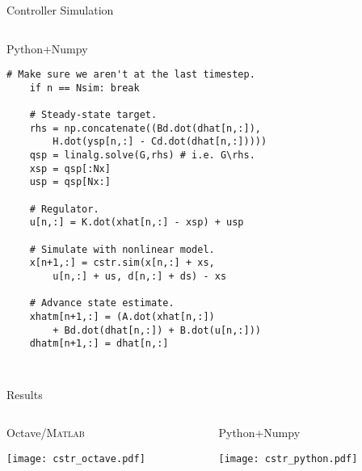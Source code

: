 \documentclass[xcolor=dvipsnames]{beamer}
\begin{document}
\begin{frame}[fragile]{Controller Simulation}
\begin{columns}[T]
\begin{column}[T]{0.45\textwidth}
\begin{block}{Python+Numpy \vphantom{/}}
\begin{lstlisting}[style=python,basicstyle=\ttfamily\fontsize{5pt}{6}\selectfont]
    # Make sure we aren't at the last timestep.
    if n == Nsim: break

    # Steady-state target.
    rhs = np.concatenate((Bd.dot(dhat[n,:]),
        H.dot(ysp[n,:] - Cd.dot(dhat[n,:]))))
    qsp = linalg.solve(G,rhs) # i.e. G\rhs.
    xsp = qsp[:Nx]
    usp = qsp[Nx:]
    
    # Regulator.
    u[n,:] = K.dot(xhat[n,:] - xsp) + usp
    
    # Simulate with nonlinear model.
    x[n+1,:] = cstr.sim(x[n,:] + xs,
        u[n,:] + us, d[n,:] + ds) - xs
    
    # Advance state estimate.
    xhatm[n+1,:] = (A.dot(xhat[n,:])
        + Bd.dot(dhat[n,:]) + B.dot(u[n,:]))
    dhatm[n+1,:] = dhat[n,:]
                       
\end{lstlisting}
\vspace{-.5em}
\end{block}
\end{column}

\end{columns}     

\end{frame}

\begin{frame}{Results}

\begin{columns}
    \begin{column}{.475\textwidth}
        \begin{block}{Octave/\textsc{Matlab}}
            \begin{center}
                \texttt{[image: cstr\_octave.pdf]}
            \end{center}
        \end{block}
    \end{column}
    
    \begin{column}{.475\textwidth}
        \begin{block}{Python+Numpy \vphantom{/}}
            \begin{center}
                \texttt{[image: cstr\_python.pdf]}
            \end{center}
        \end{block}
    \end{column}
\end{columns}

\end{frame}
\end{document}

